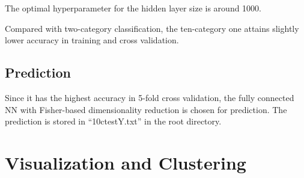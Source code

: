 \documentclass{article}
\begin{document}
{{        The optimal hyperparameter for the hidden layer size is around 1000. 

        Compared with two-category classification, the ten-category one attains slightly lower accuracy in training and cross validation.

    }

    \subsection{Prediction}
    {
        Since it has the highest accuracy in 5-fold cross validation, the fully connected NN with Fisher-based dimensionality reduction is chosen for prediction. 
        The prediction is stored in ``10ctestY.txt'' in the root directory.
    }
}

\section{Visualization and Clustering}
\end{document}
